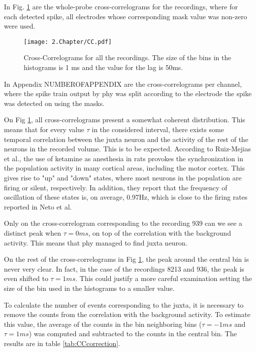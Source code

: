 In Fig. \ref{fig:CC} are the whole-probe cross-correlograms for the recordings, where for each detected spike, all electrodes whose corresponding mask value was non-zero were used.

\begin{figure}[!h]
	\centering
	\texttt{[image: 2.Chapter/CC.pdf]}
	\caption{Cross-Correlograms for all the recordings. The size of the bins in the histograms is 1 ms and the value for the lag is 50ms.
}
\label{fig:CC}
\end{figure}

In Appendix NUMBEROFAPPENDIX are the cross-correlograms per channel, where the spike train output by phy was split according to the electrode the spike was detected on using the masks.

On Fig \ref{fig:CC}, all cross-correlograms present a somewhat coherent distribution. This means that for every value $\tau$ in the considered interval, there exists some temporal correlation between the juxta neuron and the activity of the rest of the neurons in the recorded volume. This is to be expected. According to Ruiz-Mejias et al., the use of ketamine as anesthesia in rats provokes the synchronization in the population activity in many cortical areas, including the motor cortex. This gives rise to "up" and "down" states, where most neurons in the population are firing or silent, respectively. In addition, they report that the frequency of oscillation of these states is, on average, 0.97Hz, which is close to the firing rates reported in Neto et al. 

Only on the cross-correlogram corresponding to the recording 939 can we see a distinct peak when $\tau=0 ms$, on top of the correlation with the background activity. This means that phy managed to find juxta neuron.

On the rest of the cross-correlograms in Fig \ref{fig:CC}, the peak around the central bin is never very clear. In fact, in the case of the recordings 8213 and 936, the peak is even shifted to $\tau=1 ms$. This could justify a more careful examination setting the size of the bin used in the histograms to a smaller value.

To calculate the number of events corresponding to the juxta, it is necessary to remove the counts from the correlation with the background activity. To estimate this value, the average of the counts in the bin neighboring bins ($\tau = -1ms$ and $\tau = 1 ms$) was computed and subtracted to the counts in the central bin. The results are in table \ref{tab:CCcorrection}.

